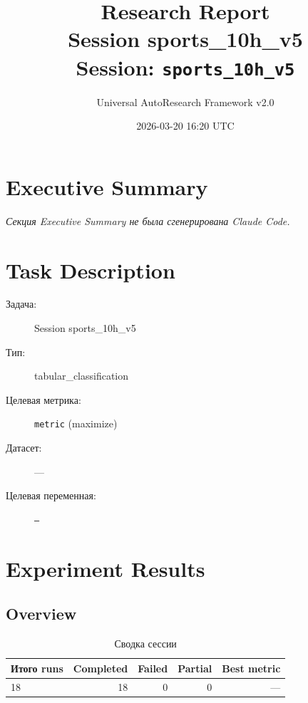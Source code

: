 \documentclass[12pt,a4paper]{article}
\title{
    \Large\textbf{Research Report}\\[0.5em]
    \large Session sports\_10h\_v5\\[0.3em]
    \normalsize Session: \texttt{sports\_10h\_v5}
}
\author{Universal AutoResearch Framework v2.0}
\date{2026-03-20 16:20 UTC}
\begin{document}
\maketitle
\tableofcontents
\newpage


\section{Executive Summary}

\textit{Секция Executive Summary не была сгенерирована Claude Code.}



\section{Task Description}

\begin{description}
    \item[Задача:] Session sports\_10h\_v5
    \item[Тип:] tabular\_classification
    \item[Целевая метрика:] \texttt{metric}
        (maximize)
    \item[Датасет:] ---
    \item[Целевая переменная:] \texttt{---}
\end{description}




\section{Experiment Results}

\subsection{Overview}

\begin{table}[H]
\centering
\caption{Сводка сессии}
\begin{tabular}{lrrrr}
\toprule
Итого runs & Completed & Failed & Partial & Best metric \\
\midrule
18 & \textcolor{passcolor}{18}
    & \textcolor{failcolor}{0}
    & \textcolor{partialcolor}{0}
    & --- \\
\bottomrule
\end{tabular}
\end{table}
\end{document}
